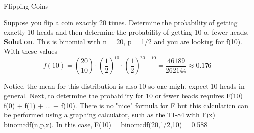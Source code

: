 \documentclass[10pt,]{book}
\numberwithin{equation}{section}
\begin{document}
%
\par
\hypertarget{p-871}{}%
Flipping Coins%
\par
\hypertarget{p-872}{}%
Suppose you flip a coin exactly 20 times. Determine the probability of getting exactly 10 heads and then determine the probability of getting 10 or fewer heads.%
\textbf{Solution}.\quad%
\hypertarget{p-873}{}%
This is binomial with n = 20, p = 1/2 and you are looking for f(10). With these values%
\begin{equation*}
f(10) = \binom{20}{10} \cdot \left ( \frac{1}{2} \right )^{10} \cdot \left ( \frac{1}{2} \right 	)^{20-10} = \frac{46189}{262144} \approx 0.176
\end{equation*}
%
\par
\hypertarget{p-874}{}%
Notice, the mean for this distribution is also 10 so one might expect 10 heads in general.  Next, to determine the probability for 10 or fewer heads requires F(10) = f(0) + f(1) + ... + f(10). There is no "nice" formula for F but this calculation can be performed using a graphing calculator, such as the TI-84 with F(x) = binomcdf(n,p,x). In this case, F(10) = binomcdf(20,1/2,10) = 0.588.%
%
%
\typeout{************************************************}
\typeout{************************************************}
%
\end{document}
